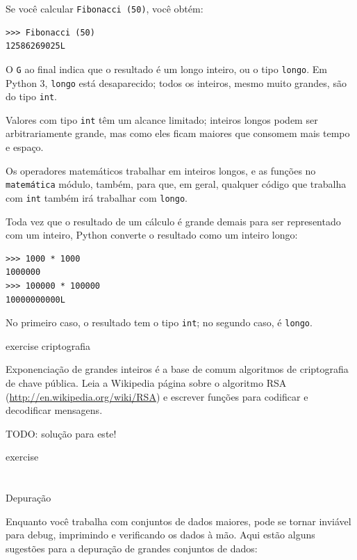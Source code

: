 \documentclass[10pt]{book}
\begin{document}
\begin{exercise}
\begin{v erbatim}
Se você calcular {\tt Fibonacci (50)}, você obtém:

\begin{verbatim}
>>> Fibonacci (50)
12586269025L
\end{verbatim}
%
O {\tt G} ao final indica que o resultado é um longo
inteiro, ou o tipo {\tt longo}. Em Python 3, {\tt longo} está desaparecido; todos os inteiros,
mesmo muito grandes, são do tipo {\tt int}.

Valores com tipo {\tt int} têm um alcance limitado;
inteiros longos podem ser arbitrariamente grande, mas como eles ficam maiores
que consomem mais tempo e espaço.

Os operadores matemáticos trabalhar em inteiros longos, e as funções
no {\tt matemática} módulo, também, para que, em geral, qualquer código que
trabalha com {\tt int} também irá trabalhar com {\tt longo}.

Toda vez que o resultado de um cálculo é grande demais para ser representado com
um inteiro, Python converte o resultado como um inteiro longo:

\begin{verbatim}
>>> 1000 * 1000
1000000
>>> 100000 * 100000
10000000000L
\end{verbatim}
%
No primeiro caso, o resultado tem o tipo {\tt int}; no
segundo caso, é {\tt longo}.

\begin{} exercise
\index{} criptografia

Exponenciação de grandes inteiros é a base de comum
algoritmos de criptografia de chave pública. Leia a Wikipedia
página sobre o algoritmo RSA (\url{http://en.wikipedia.org/wiki/RSA})
e escrever funções para codificar e decodificar mensagens.

TODO: solução para este!

\end{} exercise


\section{} Depuração

Enquanto você trabalha com conjuntos de dados maiores, pode se tornar inviável para
debug, imprimindo e verificando os dados à mão. Aqui estão alguns
sugestões para a depuração de grandes conjuntos de dados:

\begin{description}


\end{description}
\end{v erbatim}
\end{exercise}
\end{document}
